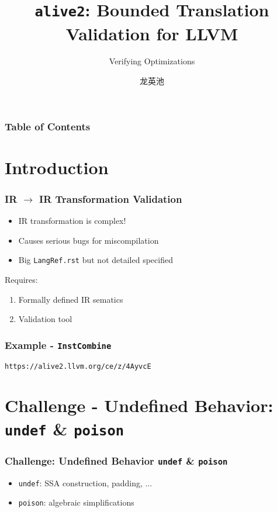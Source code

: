 \documentclass[aspectratio=169]{ctexbeamer}
\title{\texttt{alive2}: Bounded Translation Validation for LLVM\cite{lopes2021alive2}}
\subtitle{Verifying Optimizations}
\author{龙英池}
\institute{HIT}
\begin{document}
\maketitle
\begin{frame}
    \frametitle{Table of Contents}
    \tableofcontents
\end{frame}

\section{Introduction}
\begin{frame}
    \frametitle{IR $\rightarrow$ IR Transformation Validation}
    \begin{itemize}
        \item IR transformation is complex!
        \item Causes serious bugs for miscompilation
        \item Big \texttt{LangRef.rst} but not detailed specified
    \end{itemize}

    \vspace{2em}

    Requires:

    \begin{enumerate}
        \item Formally defined IR sematics
        \item Validation tool
    \end{enumerate}

\end{frame}

\begin{frame}
    \frametitle{Example - \texttt{InstCombine}}

    \texttt{https://alive2.llvm.org/ce/z/4AyvcE}

\end{frame}


\section{Challenge - Undefined Behavior: \texttt{undef} \& \texttt{poison}}


\begin{frame}
    \frametitle{Challenge: Undefined Behavior \texttt{undef} \& \texttt{poison} ~\cite{lee_2020}}
    \begin{itemize}
        \item \texttt{undef}: SSA construction, padding, $\dots$
        \item \texttt{poison}: algebraic simplifications
    \end{itemize}
\end{frame}
\end{document}
